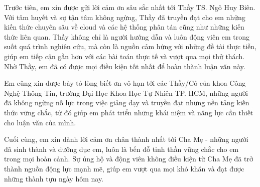 \documentclass{article}[14pt]
\begin{document}
    
    {
    Trước tiên, em xin được gửi lời cảm ơn sâu sắc nhất tới Thầy TS. Ngô Huy Biên. Với tâm huyết và sự tận tâm không ngừng, Thầy đã truyền đạt cho em những kiến thức chuyên sâu về cloud và các hệ thống phân tán cũng như những kiến thức liên quan. Thầy không chỉ là người hướng dẫn và luôn động viên em trong suốt quá trình nghiên cứu, mà còn là nguồn cảm hứng với những đề tài thực tiễn, giúp em tiếp cận gần hơn với các bài toán thực tế và vượt qua mọi thử thách. Nhờ Thầy, em đã có được mọi điều kiện tốt nhất để hoàn thành luận văn này.

Em cũng xin được bày tỏ lòng biết ơn vô hạn tới các Thầy/Cô của khoa Công Nghệ Thông Tin, trường Đại Học Khoa Học Tự Nhiên TP. HCM, những người đã không ngừng nỗ lực trong việc giảng dạy và truyền đạt những nền tảng kiến thức vững chắc, từ đó giúp em phát triển những khái niệm và năng lực cần thiết cho luận văn của mình.

Cuối cùng, em xin dành lời cảm ơn chân thành nhất tới Cha Mẹ - những người đã sinh thành và dưỡng dục em, luôn là bến đỗ tinh thần vững chắc cho em trong mọi hoàn cảnh. Sự ủng hộ và động viên không điều kiện từ Cha Mẹ đã trở thành nguồn động lực mạnh mẽ, giúp em vượt qua mọi khó khăn và đạt được những thành tựu ngày hôm nay.
    }
















 \pagebreak
 

\tableofcontents





\pagebreak


{}


\renewcommand{\listfigurename}{\centering \MakeUppercase{DANH MỤC HÌNH ẢNH}}
\listoffigures

\end{document}
